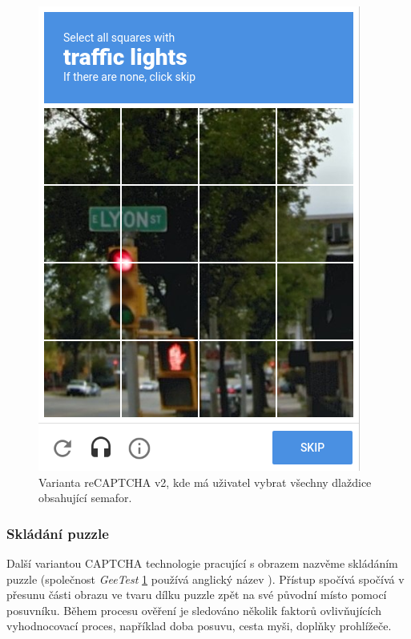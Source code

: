 \documentclass[
  master=true,
  biblatex,
  glossaries,
  index
]{kidiplom}
\begin{document}
\begin{figure}
  \centering
  \includegraphics[scale=0.8]{images/squares.png}
  \caption{Varianta reCAPTCHA v2, kde má uživatel vybrat všechny dlaždice obsahující semafor.}
  \label{fig:captcha_geetest}
\end{figure}

\subsubsection*{Skládání puzzle}
Další variantou CAPTCHA technologie pracující s obrazem nazvěme skládáním puzzle (společnost \textit{GeeTest} \ref{fig:captcha_geetest} používá anglický název ). Přístup spočívá spočívá v přesunu části obrazu ve tvaru dílku puzzle zpět na své původní místo pomocí posuvníku. Během procesu ověření je sledováno několik faktorů ovlivňujících vyhodnocovací proces, například doba posuvu, cesta myši, doplňky prohlížeče. 
\end{document}
